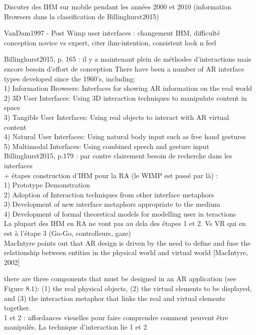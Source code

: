 Discuter des IHM sur mobile pendant les années 2000 et 2010 (information Browsers dans la classification de Billinghurst2015)

VanDam1997 - Post Wimp user interfaces : changement IHM, difficulté conception novice vs expert, citer ihm-intention, consistent look n feel

Billinghurst2015, p. 165 : il y a maintenant plein de méthodes d'interactions mais encore besoin d'effort de conception
There have been a number of AR interface types developed since the 1960’s, including:\\
1) Information Browsers: Interfaces for showing AR information on the real world\\
2) 3D User Interfaces: Using 3D interaction techniques to manipulate content in space\\
3) Tangible User Interfaces: Using real objects to interact with AR virtual content\\
4) Natural User Interfaces: Using natural body input such as free hand gestures\\
5) Multimodal Interfaces: Using combined speech and gesture input\\

Billinghurst2015, p.179 : par contre clairement besoin de recherche dans les interfaces\\
+ étapes construction d'IHM pour la RA (le WIMP est passé par là) :\\
1) Prototype Demonstration\\
2) Adoption of Interaction techniques from other interface metaphors\\
3) Development of new interface metaphors appropriate to the medium\\
4) Development of formal theoretical models for modelling user in teractions\\
La plupart des IHM en RA ne vont pas au dela des étapes 1 et 2. Vs VR qui en est à l'étape 3 (Go-Go, controlleurs, gaze)\\
MacIntyre points out that AR design is driven by the need to define and fuse the relationship between entities in the physical world and virtual world [MacIntyre, 2002]

there are three components that must be designed in an AR application (see Figure 8.1): (1) the real physical objects, (2) the virtual elements to be displayed, and (3) the interaction metaphor that links the real and virtual elements together.\\
1 et 2 : affordances visuelles pour faire comprendre comment peuvent être manipulés. La technique d'interaction lie 1 et 2

